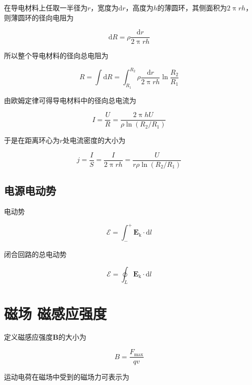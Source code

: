 \documentclass[12pt]{article}
\newcommand{\rmd}{\mathrm{d}}
\begin{document}
在导电材料上任取一半径为$r$，宽度为$\rmd r$，高度为$h$的薄圆环，其侧面积为$2 \uppi r h$，则薄圆环的径向电阻为

\begin{equation*}
    \rmd R = \rho \frac{\rmd r}{2 \uppi rh}
\end{equation*}

所以整个导电材料的径向总电阻为

\begin{equation*}
    R = \int \rmd R = \int_{R_1}^{R_2} \rho \frac{\rmd r}{2 \uppi rh} \ln \frac{R_2}{R_1}
\end{equation*}

由欧姆定律可得导电材料中的径向总电流为

\begin{equation*}
    I = \frac{U}{R} = \frac{2 \uppi h U}{\rho \ln(R_2/R_1)}
\end{equation*}

于是在距离环心为\(r\)处电流密度的大小为

\begin{equation*}
    j = \frac{I}{S} = \frac{I}{2 \uppi r h} = \frac{U}{r \rho \ln(R_2/R_1)}
\end{equation*}

\subsection{电源\quad 电动势}

电动势

\begin{equation}
    \mathcal{E} = \int_{-}^{+} \boldsymbol{E}_{\text{k}} \cdot \rmd l
\end{equation}

闭合回路的总电动势

\begin{equation}
    \mathcal{E} = \oint_L \boldsymbol{E}_{\text{k}} \cdot \rmd l
\end{equation}

\section{磁场 \quad 磁感应强度}

定义磁感应强度\(\boldsymbol{B}\)的大小为

\begin{equation}
    B = \frac{F_{\text{max}}}{qv}
\end{equation}

运动电荷在磁场中受到的磁场力可表示为
\end{document}
